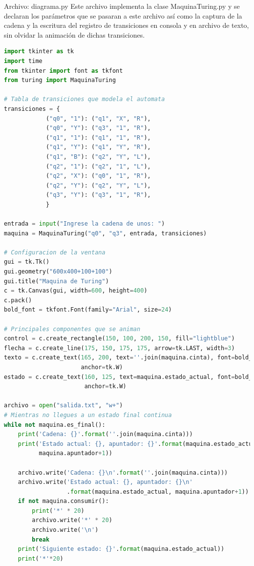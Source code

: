 Archivo: diagrama.py
Este archivo implementa la clase MaquinaTuring.py y se declaran los parámetros que se pasaran a este archivo así como la captura de la cadena y la escritura del registro de transiciones en consola y en archivo de texto, sin olvidar la animación de dichas transiciones.
\begin{lstlisting}[language=Python]
import tkinter as tk
import time
from tkinter import font as tkfont
from turing import MaquinaTuring

# Tabla de transiciones que modela el automata
transiciones = {
            ("q0", "1"): ("q1", "X", "R"),
            ("q0", "Y"): ("q3", "1", "R"),
            ("q1", "1"): ("q1", "1", "R"),
            ("q1", "Y"): ("q1", "Y", "R"),
            ("q1", "B"): ("q2", "Y", "L"),
            ("q2", "1"): ("q2", "1", "L"),
            ("q2", "X"): ("q0", "1", "R"),
            ("q2", "Y"): ("q2", "Y", "L"),
            ("q3", "Y"): ("q3", "1", "R"),
            }

entrada = input("Ingrese la cadena de unos: ")
maquina = MaquinaTuring("q0", "q3", entrada, transiciones)

# Configuracion de la ventana
gui = tk.Tk()
gui.geometry("600x400+100+100")
gui.title("Maquina de Turing")
c = tk.Canvas(gui, width=600, height=400)
c.pack()
bold_font = tkfont.Font(family="Arial", size=24)

# Principales componentes que se animan
control = c.create_rectangle(150, 100, 200, 150, fill="lightblue")
flecha = c.create_line(175, 150, 175, 175, arrow=tk.LAST, width=3)
texto = c.create_text(165, 200, text=''.join(maquina.cinta), font=bold_font,
                      anchor=tk.W)
estado = c.create_text(160, 125, text=maquina.estado_actual, font=bold_font,
                       anchor=tk.W)

archivo = open("salida.txt", "w+")
# Mientras no llegues a un estado final continua
while not maquina.es_final():
    print('Cadena: {}'.format(''.join(maquina.cinta)))
    print('Estado actual: {}, apuntador: {}'.format(maquina.estado_actual,
          maquina.apuntador+1))

    archivo.write('Cadena: {}\n'.format(''.join(maquina.cinta)))
    archivo.write('Estado actual: {}, apuntador: {}\n'
                  .format(maquina.estado_actual, maquina.apuntador+1))
    if not maquina.consumir():
        print('*' * 20)
        archivo.write('*' * 20)
        archivo.write('\n')
        break
    print('Siguiente estado: {}'.format(maquina.estado_actual))
    print('*'*20)


\end{lstlisting}
